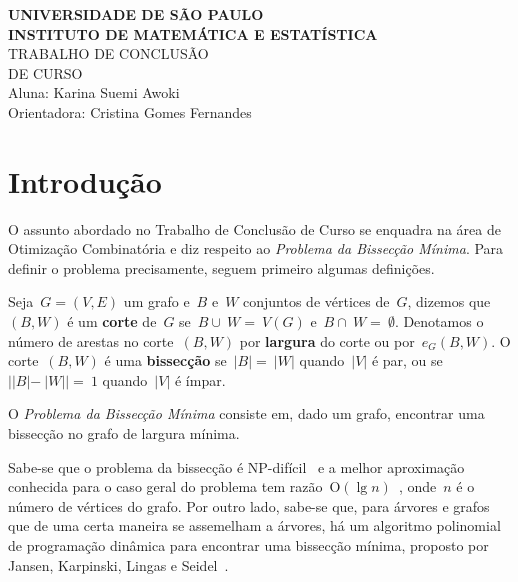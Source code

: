 \documentclass[a4paper,12pt]{article}
\newcommand{\Oh}{\mathrm{O}}
\begin{document}
 
\begin{center}
   {\large \textbf{UNIVERSIDADE DE SÃO PAULO}} \\[1.4cm]
   
   {\large \textbf{INSTITUTO DE MATEMÁTICA E ESTATÍSTICA}}\\[4.2cm]
   
   {\Huge TRABALHO DE CONCLUSÃO }\\[0.3cm]
   {\Huge DE CURSO }\\[9cm]
   
   {\large { Aluna: Karina Suemi Awoki}}\\[0.3cm]
   
   {\large { Orientadora: Cristina Gomes Fernandes}}
   

\end{center}

\newpage
\tableofcontents

\newpage


\section{Introdução}

O assunto abordado no Trabalho de Conclusão de Curso se
enquadra na área de Otimização Combinatória e diz respeito ao 
\emph{Problema da Bissecção Mínima}. Para definir o problema 
precisamente, seguem primeiro algumas definições. 

Seja~$G=(V,E)$ um grafo e~$B$ e~$W$ conjuntos de vértices de~$G$,
dizemos que~$(B,W)$ é um \textbf{corte}
de~$G$ se~$B \cup~W =~V(G)$ e~$B\cap~W =~\emptyset$.
Denotamos o número de arestas no corte~$(B,W)$ por \textbf{largura} do corte ou por~$e_G(B,W)$.
O corte~$(B,W)$ é uma \textbf{bissecção} se~$|B| =~|W|$
quando~$|V|$ é par, ou se~$||B|-~|W|| =~1$ quando~$|V|$ é ímpar.

O \emph{Problema da Bissecção Mínima} consiste em, dado um grafo, 
encontrar uma bissecção no grafo de largura mínima.

Sabe-se que o problema da bissecção é NP-difícil~\cite{GareyJS76} 
e a melhor aproximação conhecida para o caso geral do problema tem 
razão~$\Oh(\lg n)$~\cite{Racke08}, onde~$n$ é o número de vértices 
do grafo. 
Por outro lado, sabe-se que, para árvores e grafos que de uma 
certa maneira se assemelham a árvores, há um algoritmo polinomial 
de programação dinâmica para encontrar uma bissecção mínima, 
proposto por Jansen, Karpinski, Lingas e 
Seidel~\cite{JansenKLS01}. 
\end{document}
